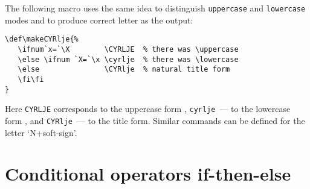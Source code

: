 The following macro uses the same idea
to distinguish {\tt\bs{}uppercase} and {\tt\bs{}lowercase}
modes and to produce correct letter as the output:
\begin{verbatim}
\def\makeCYRlje{%
   \ifnum`x=`\X        \CYRLJE  % there was \uppercase
   \else \ifnum `X=`\x \cyrlje  % there was \lowercase
   \else               \CYRlje  % natural title form
   \fi\fi
}
\end{verbatim}
Here {\tt \bs{}CYRLJE} corresponds to the uppercase form
{\cyrfont {}}, {\tt \bs{}cyrlje}~--- to the lowercase form
{\cyrfont {}}, and {\tt \bs{}CYRlje}~--- to the title
form. Similar commands can be defined for the letter `N+soft-sign'.

\section{Conditional operators \textsf{if-then-else}\label{S-ifthen}}

